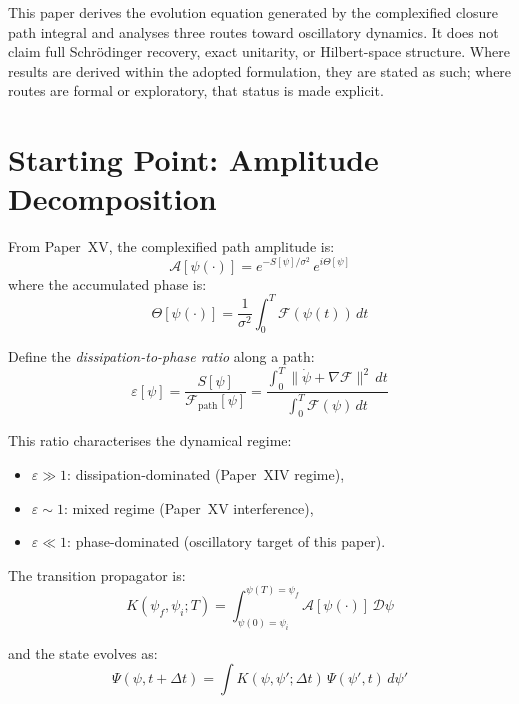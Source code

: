 \documentclass[12pt]{article}
\newcommand{\Fcal}{\mathcal{F}}
\begin{document}
This paper derives the evolution equation generated by the complexified closure path integral and analyses three routes toward oscillatory dynamics. It does not claim full Schr\"odinger recovery, exact unitarity, or Hilbert-space structure. Where results are derived within the adopted formulation, they are stated as such; where routes are formal or exploratory, that status is made explicit.

\section{Starting Point: Amplitude Decomposition}\label{sec:starting}

From Paper~XV, the complexified path amplitude is:
\begin{equation}
    \mathcal{A}[\psi(\cdot)] = e^{-S[\psi]/\sigma^2}\, e^{i\Theta[\psi]}
\end{equation}
where the accumulated phase is:
\begin{equation}
    \Theta[\psi(\cdot)] = \frac{1}{\sigma^2}\int_0^T \Fcal(\psi(t))\, dt
\end{equation}

Define the \textit{dissipation-to-phase ratio} along a path:
\begin{equation}\label{eq:epsilon}
    \varepsilon[\psi] = \frac{S[\psi]}{\Fcal_{\mathrm{path}}[\psi]} = \frac{\int_0^T \|\dot{\psi} + \nabla\Fcal\|^2\, dt}{\int_0^T \Fcal(\psi)\, dt}
\end{equation}

This ratio characterises the dynamical regime:
\begin{itemize}
    \item $\varepsilon \gg 1$: dissipation-dominated (Paper~XIV regime),
    \item $\varepsilon \sim 1$: mixed regime (Paper~XV interference),
    \item $\varepsilon \ll 1$: phase-dominated (oscillatory target of this paper).
\end{itemize}

The transition propagator is:
\begin{equation}\label{eq:propagator}
    K(\psi_f, \psi_i; T) = \int_{\psi(0)=\psi_i}^{\psi(T)=\psi_f} \mathcal{A}[\psi(\cdot)]\, \mathcal{D}\psi
\end{equation}

and the state evolves as:
\begin{equation}\label{eq:evolution}
    \Psi(\psi, t+\Delta t) = \int K(\psi, \psi'; \Delta t)\, \Psi(\psi', t)\, d\psi'
\end{equation}
\end{document}
